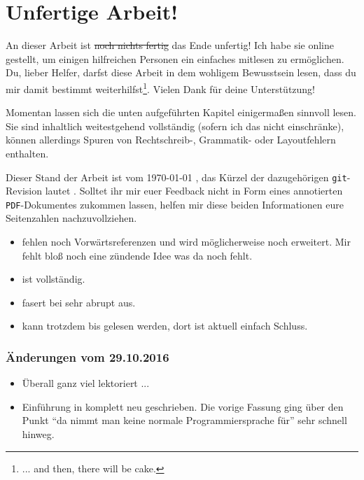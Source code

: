 \documentclass[paper=a4,fontsize=12pt,parskip=half,twoside]{scrartcl}
\title{\doctitle}
\subtitle{\docsubtitle}
\author{\docauthors}
\date{\today{}}
\begin{document}


\newpage

\section*{Unfertige Arbeit!}

An dieser Arbeit ist \sout{noch nichts fertig} das Ende unfertig! Ich habe sie online gestellt, um einigen hilfreichen Personen ein einfaches mitlesen zu ermöglichen. Du, lieber Helfer, darfst diese Arbeit in dem wohligem Bewusstsein lesen, dass du mir damit bestimmt weiterhilfst\footnote{... and then, there will be cake.}. Vielen Dank für deine Unterstützung!

Momentan lassen sich die unten aufgeführten Kapitel einigermaßen sinnvoll lesen. Sie sind inhaltlich weitestgehend vollständig (sofern ich das nicht einschränke), können allerdings Spuren von Rechtschreib-, Grammatik- oder Layoutfehlern enthalten.

Dieser Stand der Arbeit ist vom \today{} \currenttime{}, das Kürzel der dazugehörigen \texttt{git}-Revision lautet \texttt{}. Solltet ihr mir euer Feedback nicht in Form eines annotierten \texttt{PDF}-Dokumentes zukommen lassen, helfen mir diese beiden Informationen eure Seitenzahlen nachzuvollziehen.

\begin{itemize}[noitemsep]
\item {} fehlen noch Vorwärtsreferenzen und wird möglicherweise noch erweitert. Mir fehlt bloß noch eine zündende Idee was da noch fehlt.
\item {} ist vollständig.
\item {} fasert bei  sehr abrupt aus.
\item {} kann trotzdem bis  gelesen werden, dort ist aktuell einfach Schluss.
\end{itemize}

\subsubsection*{Änderungen vom 29.10.2016}
\begin{itemize}[noitemsep]
\item Überall ganz viel lektoriert ...
\item Einführung in  komplett neu geschrieben. Die vorige Fassung ging über den Punkt "`da nimmt man keine normale Programmiersprache für"' sehr schnell hinweg.
\end{itemize}
\end{document}
